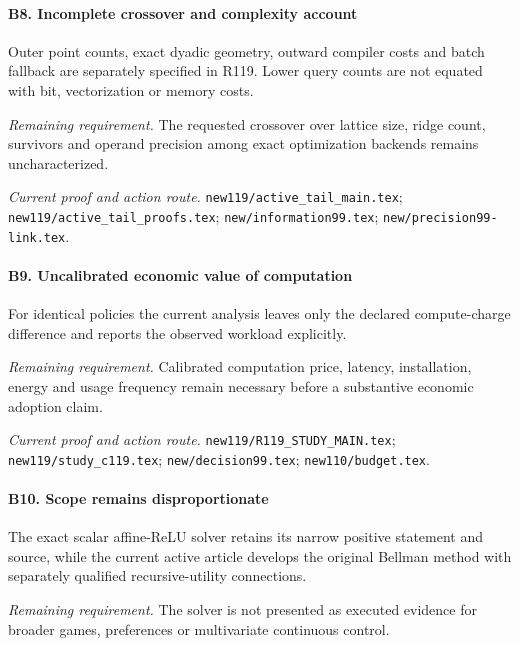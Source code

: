 \paragraph{B8. Incomplete crossover and complexity account}

Outer point counts, exact dyadic geometry, outward compiler costs and batch fallback are separately specified in R119. Lower query counts are not equated with bit, vectorization or memory costs.

\par\emph{Remaining requirement.} The requested crossover over lattice size, ridge count, survivors and operand precision among exact optimization backends remains uncharacterized.

\par\emph{Current proof and action route.} \nolinkurl{new119/active_tail_main.tex}; \nolinkurl{new119/active_tail_proofs.tex}; \nolinkurl{new/information99.tex}; \nolinkurl{new/precision99-link.tex}.

\paragraph{B9. Uncalibrated economic value of computation}

For identical policies the current analysis leaves only the declared compute-charge difference and reports the observed workload explicitly.

\par\emph{Remaining requirement.} Calibrated computation price, latency, installation, energy and usage frequency remain necessary before a substantive economic adoption claim.

\par\emph{Current proof and action route.} \nolinkurl{new119/R119_STUDY_MAIN.tex}; \nolinkurl{new119/study_c119.tex}; \nolinkurl{new/decision99.tex}; \nolinkurl{new110/budget.tex}.

\paragraph{B10. Scope remains disproportionate}

The exact scalar affine-ReLU solver retains its narrow positive statement and source, while the current active article develops the original Bellman method with separately qualified recursive-utility connections.

\par\emph{Remaining requirement.} The solver is not presented as executed evidence for broader games, preferences or multivariate continuous control.

